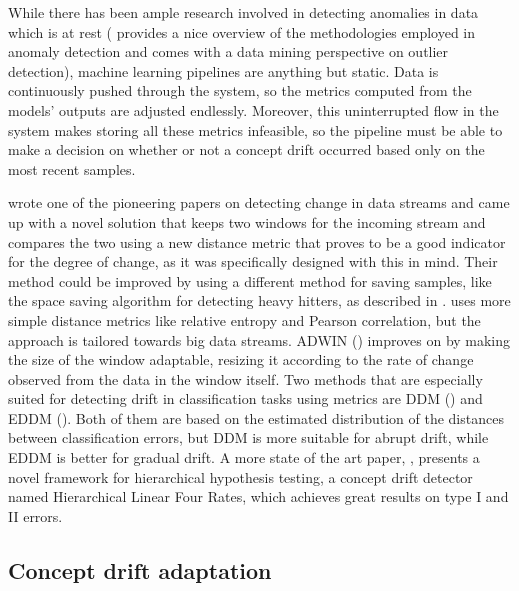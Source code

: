 \documentclass[12pt]{extreport}
\begin{document}
While there has been ample research involved in detecting anomalies in data which is at rest (\cite{survey-outlier-detection} provides a nice overview of the methodologies employed in anomaly detection and \cite{there-and-back-again} comes with a data mining perspective on outlier detection), machine learning pipelines are anything but static. Data is continuously pushed through the system, so the metrics computed from the models’ outputs are adjusted endlessly. Moreover, this uninterrupted flow in the system makes storing all these metrics infeasible, so the pipeline must be able to make a decision on whether or not a concept drift occurred based only on the most recent samples.

\cite{detecting-change-in-data-streams} wrote one of the pioneering papers on detecting change in data streams and came up with a novel solution that keeps two windows for the incoming stream and compares the two using a new distance metric that proves to be a good indicator for the degree of change, as it was specifically designed with this in mind. Their method could be improved by using a different method for saving samples, like the space saving algorithm for detecting heavy hitters, as described in \cite{hierarchical-heavy-hitters}. \cite{onlineanomalydetection} uses more simple distance metrics like relative entropy and Pearson correlation, but the approach is tailored towards big data streams. ADWIN (\cite{adwin}) improves on \cite{detecting-change-in-data-streams} by making the size of the window adaptable, resizing it according to the rate of change observed from the data in the window itself. Two methods that are especially suited for detecting drift in classification tasks using metrics are DDM (\cite{ddm}) and EDDM (\cite{eddm}). Both of them are based on the estimated distribution of the distances between classification errors, but DDM is more suitable for abrupt drift, while EDDM is better for gradual drift. A more state of the art paper, \cite{hht}, presents a novel framework for hierarchical hypothesis testing, a concept drift detector named Hierarchical Linear Four Rates, which achieves great results on type I and II errors.

\subsection{Concept drift adaptation}
\end{document}
